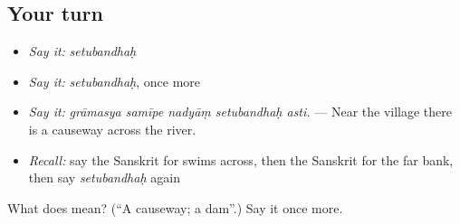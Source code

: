 \subsection*{Your turn}
\begin{itemize}
\raggedright
  \item \emph{Say it:} \emph{setubandhaḥ}
  \item \emph{Say it:} \emph{setubandhaḥ}, once more
  \item \emph{Say it:} \emph{grāmasya samīpe nadyāṃ setubandhaḥ asti.} — Near the village there is a causeway across the river.
  \item \emph{Recall:} say the Sanskrit for swims across, then the Sanskrit for the far bank, then say \emph{setubandhaḥ} again
\end{itemize}

\begin{tcolorbox}[breakable,colback=teal!4,colframe=teal!35!black,title={Before you move on}]
What does  mean? (\textquotedblleft{}A causeway; a dam\textquotedblright{}.) Say it once more.
\end{tcolorbox}
